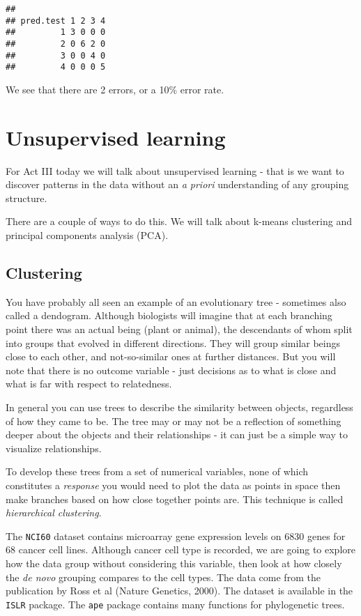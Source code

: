 \documentclass[]{article}
\begin{document}
\begin{verbatim}
##          
## pred.test 1 2 3 4
##         1 3 0 0 0
##         2 0 6 2 0
##         3 0 0 4 0
##         4 0 0 0 5
\end{verbatim}

We see that there are 2 errors, or a 10\% error rate.

\section{Unsupervised learning}\label{unsupervised-learning}

For Act III today we will talk about unsupervised learning - that is we
want to discover patterns in the data without an \emph{a priori}
understanding of any grouping structure.

There are a couple of ways to do this. We will talk about k-means
clustering and principal components analysis (PCA).

\subsection{Clustering}\label{clustering}

You have probably all seen an example of an evolutionary tree -
sometimes also called a dendogram. Although biologists will imagine that
at each branching point there was an actual being (plant or animal), the
descendants of whom split into groups that evolved in different
directions. They will group similar beings close to each other, and
not-so-similar ones at further distances. But you will note that there
is no outcome variable - just decisions as to what is close and what is
far with respect to relatedness.

In general you can use trees to describe the similarity between objects,
regardless of how they came to be. The tree may or may not be a
reflection of something deeper about the objects and their relationships
- it can just be a simple way to visualize relationships.

To develop these trees from a set of numerical variables, none of which
constitutes a \emph{response} you would need to plot the data as points
in space then make branches based on how close together points are. This
technique is called \emph{hierarchical clustering}.

The \texttt{NCI60} dataset contains microarray gene expression levels on
6830 genes for 68 cancer cell lines. Although cancer cell type is
recorded, we are going to explore how the data group without considering
this variable, then look at how closely the \emph{de novo} grouping
compares to the cell types. The data come from the publication by Ross
et al (Nature Genetics, 2000). The dataset is available in the
\texttt{ISLR} package. The \texttt{ape} package contains many functions
for phylogenetic trees.
\end{document}
